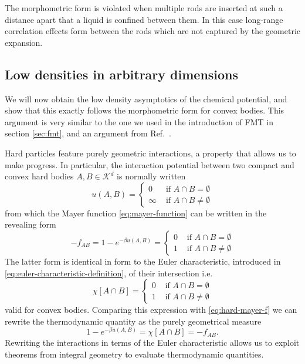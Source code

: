 \documentclass[11pt,twoside]{report}
\begin{document}
The morphometric form is violated when multiple rods are inserted at such a distance apart that a liquid is confined between them.
In this case long-range correlation effects form between the rods which are not captured by the geometric expansion.

\subsection{Low densities in arbitrary dimensions}
\label{sec:low-densities}

We will now obtain the low density asymptotics of the chemical potential, and show that this exactly follows the morphometric form for convex bodies.
This argument is very similar to the one we used in the introduction of FMT in section \ref{sec:fmt}, and an argument from Ref.\ \cite{WertheimMP1994}.

Hard particles feature purely geometric interactions, a property that allows us to make progress.
In particular, the interaction potential between two compact and convex hard bodies $A,B \in \mathcal{K}^d$ is normally written
\begin{equation*}\label{eq:hard-mayer-f}
  u(A,B)
  =
  \begin{cases}
    0 & \textrm{ if } A \cap B = \emptyset \\
    \infty & \textrm{ if } A \cap B \ne \emptyset
  \end{cases}
\end{equation*}
from which the Mayer function \eqref{eq:mayer-function} can be written in the revealing form
\begin{equation*}\label{eq:hard-mayer-f}
  -f_{AB}
  =
  1 - e^{-\beta u(A,B)}
  =
  \begin{cases}
    0 & \textrm{ if } A \cap B = \emptyset \\
    1 & \textrm{ if } A \cap B \ne \emptyset
  \end{cases}
\end{equation*}
The latter form is identical in form to the Euler characteristic, introduced in \eqref{eq:euler-characteristic-definition}, of their intersection i.e.\
\begin{equation*}
  \chi[A \cap B] =
    \begin{cases}
    0 & \textrm{ if } A \cap B = \emptyset \\
    1 & \textrm{ if } A \cap B \ne \emptyset
    \end{cases}
\end{equation*}
valid for convex bodies.
Comparing this expression with \eqref{eq:hard-mayer-f} we can rewrite the thermodynamic quantity as the purely geometrical measure
\begin{equation}\label{eq:chi-replacement}
  1 - e^{-\beta u(A,B)} = \chi[A \cap B] = -f_{AB}.
\end{equation}
Rewriting the interactions in terms of the Euler characteristic allows us to exploit theorems from integral geometry to evaluate thermodynamic quantities.
\end{document}
